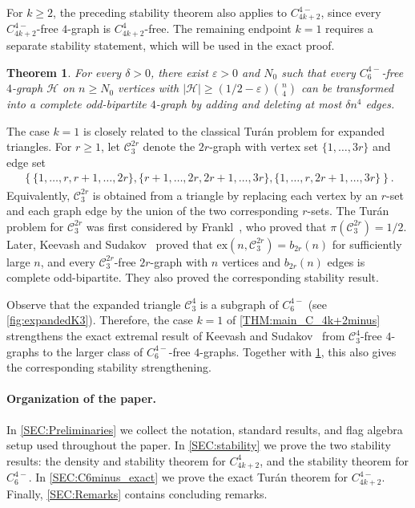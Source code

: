 \documentclass[10pt,a4paper]{article}
\theoremstyle{plain}
\newtheorem{theorem}[theorem]{Theorem}
\theoremstyle{definition}
\begin{document}
For $k\ge2$, the preceding stability theorem also applies to $C_{4k+2}^{4-}$, since every $C_{4k+2}^{4-}$-free $4$-graph is $C_{4k+2}^{4}$-free.
The remaining endpoint $k=1$ requires a separate stability statement, which will be used in the exact proof.

\begin{theorem}\label{THM:stabi_C6minus}
For every $\delta >0$, there exist $\varepsilon > 0$ and $N_0$ such that every $C_{6}^{4-}$-free $4$-graph $\mathcal{H}$ on $n \ge N_0$ vertices with $|\mathcal{H}| \ge \left(1/2 - \varepsilon\right) \binom{n}{4}$ can be transformed into a complete odd-bipartite $4$-graph by adding and deleting at most $\delta n^4$ edges. 
\end{theorem}

The case $k=1$ is closely related to the classical Tur\'{a}n problem for expanded triangles. 
For $r \ge 1$, let $\mathcal{C}^{2r}_{3}$ denote the $2r$-graph with vertex set $\{1,\ldots,3r\}$ and edge set 
\begin{align*}
    \left\{\{1,\ldots, r, r+1, \ldots, 2r\}, \{r+1, \ldots, 2r, 2r+1, \ldots, 3r\}, \{1,\ldots, r, 2r+1, \ldots, 3r\}\right\}. 
\end{align*}
Equivalently, $\mathcal{C}^{2r}_{3}$ is obtained from a triangle by replacing each vertex by an $r$-set and each graph edge by the union of the two corresponding $r$-sets.
The Tur\'{a}n problem for $\mathcal{C}^{2r}_{3}$ was first considered by
Frankl~\cite{Frankl90}, who proved that $\pi(\mathcal{C}^{2r}_{3}) = 1/2$. 
Later, Keevash and Sudakov~\cite{KS05a} proved that $\mathrm{ex}(n,\mathcal{C}^{2r}_{3}) = b_{2r}(n)$ for sufficiently large $n$, and every $\mathcal{C}^{2r}_{3}$-free $2r$-graph with $n$ vertices and $b_{2r}(n)$ edges is complete odd-bipartite. 
They also proved the corresponding stability result. 
 
Observe that the expanded triangle $\mathcal{C}^{4}_{3}$ is a subgraph of $C_6^{4-}$ (see \cref{fig:expandedK3}). 
Therefore, the case $k=1$ of \cref{THM:main_C_4k+2minus} strengthens the exact extremal result of Keevash and Sudakov~\cite{KS05a} from $\mathcal{C}^{4}_{3}$-free $4$-graphs to the larger class of $C_6^{4-}$-free $4$-graphs. 
Together with \cref{THM:stabi_C6minus}, this also gives the corresponding stability strengthening.


\paragraph{Organization of the paper.}
In \cref{SEC:Preliminaries} we collect the notation, standard results, and flag algebra setup used throughout the paper.
In \cref{SEC:stability} we prove the two stability results: the density and stability theorem for $C_{4k+2}^4$, and the stability theorem for $C_6^{4-}$.
In \cref{SEC:C6minus_exact} we prove the exact Tur\'{a}n theorem for $C_{4k+2}^{4-}$.
Finally, \cref{SEC:Remarks} contains concluding remarks.
\end{document}
